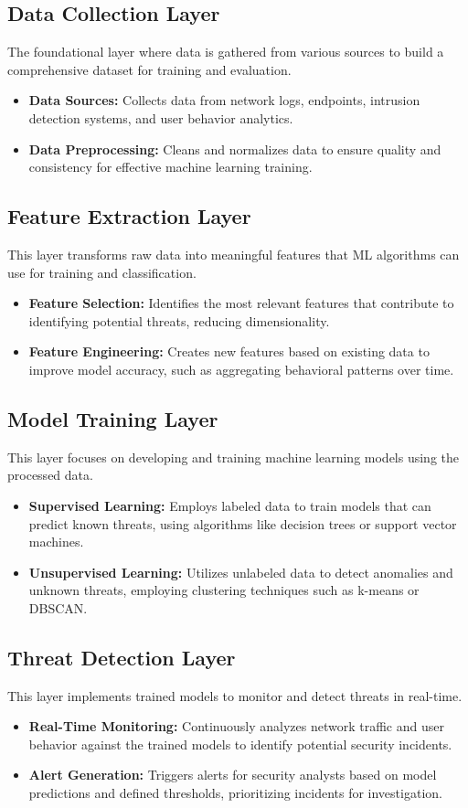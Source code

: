 \documentclass[oneside,a4paper,12pt]{report}
\begin{document}
\subsection{Data Collection Layer}
The foundational layer where data is gathered from various sources to build a comprehensive dataset for training and evaluation.
\begin{itemize}
    \item \textbf{Data Sources:} Collects data from network logs, endpoints, intrusion detection systems, and user behavior analytics.
    \item \textbf{Data Preprocessing:} Cleans and normalizes data to ensure quality and consistency for effective machine learning training.
\end{itemize}

\subsection{Feature Extraction Layer}
This layer transforms raw data into meaningful features that ML algorithms can use for training and classification.
\begin{itemize}
    \item \textbf{Feature Selection:} Identifies the most relevant features that contribute to identifying potential threats, reducing dimensionality.
    \item \textbf{Feature Engineering:} Creates new features based on existing data to improve model accuracy, such as aggregating behavioral patterns over time.
\end{itemize}

\subsection{Model Training Layer}
This layer focuses on developing and training machine learning models using the processed data.
\begin{itemize}
    \item \textbf{Supervised Learning:} Employs labeled data to train models that can predict known threats, using algorithms like decision trees or support vector machines.
    \item \textbf{Unsupervised Learning:} Utilizes unlabeled data to detect anomalies and unknown threats, employing clustering techniques such as k-means or DBSCAN.
\end{itemize}

\subsection{Threat Detection Layer}
This layer implements trained models to monitor and detect threats in real-time.
\begin{itemize}
    \item \textbf{Real-Time Monitoring:} Continuously analyzes network traffic and user behavior against the trained models to identify potential security incidents.
    \item \textbf{Alert Generation:} Triggers alerts for security analysts based on model predictions and defined thresholds, prioritizing incidents for investigation.
\end{itemize}
\end{document}
